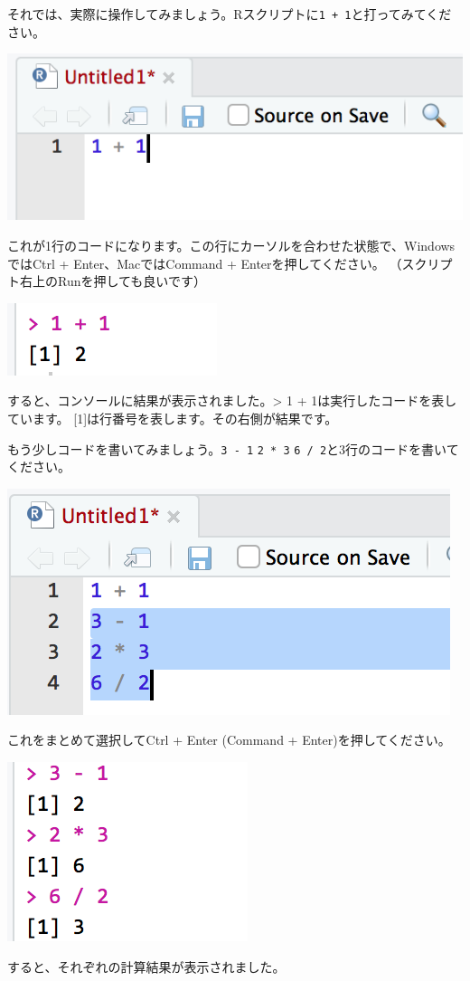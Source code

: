 \documentclass[]{book}
\begin{document}
それでは、実際に操作してみましょう。Rスクリプトに\texttt{1\ +\ 1}と打ってみてください。

\begin{center}\includegraphics[width=0.4\linewidth]{image/basic1} \end{center}

これが1行のコードになります。この行にカーソルを合わせた状態で、WindowsではCtrl
+ Enter、MacではCommand + Enterを押してください。
（スクリプト右上のRunを押しても良いです）

\begin{center}\includegraphics[width=0.2\linewidth]{image/basic2} \end{center}

すると、コンソールに結果が表示されました。\textgreater{} 1 +
1は実行したコードを表しています。
{[}1{]}は行番号を表します。その右側が結果です。

もう少しコードを書いてみましょう。\texttt{3\ -\ 1} \texttt{2\ *\ 3}
\texttt{6\ /\ 2}と3行のコードを書いてください。

\begin{center}\includegraphics[width=0.4\linewidth]{image/basic3} \end{center}

これをまとめて選択してCtrl + Enter (Command + Enter)を押してください。

\begin{center}\includegraphics[width=0.2\linewidth]{image/basic4} \end{center}

すると、それぞれの計算結果が表示されました。
\end{document}
